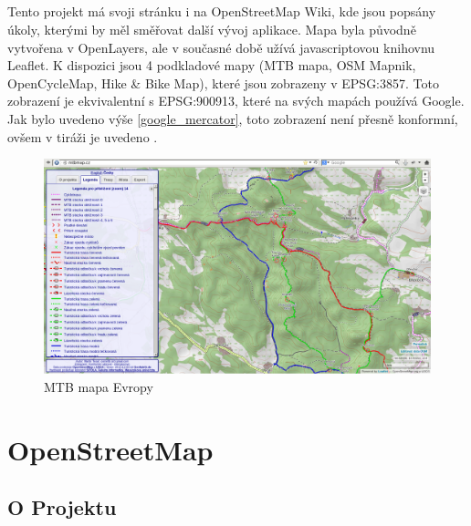 \documentclass[11pt,a4paper,titlepage,oneside]{book}
\begin{document}

		\paragraph{} Tento projekt má svoji stránku i na OpenStreetMap Wiki, kde jsou popsány úkoly, kterými by měl směřovat další vývoj aplikace. Mapa byla původně vytvořena v OpenLayers\cite{tesar_bp}, ale v současné době užívá javascriptovou knihovnu Leaflet. K dispozici jsou 4 podkladové mapy (MTB mapa, OSM Mapnik, OpenCycleMap, Hike \& Bike Map), které jsou zobrazeny v EPSG:3857. Toto zobrazení je ekvivalentní s EPSG:900913, které na svých mapách používá Google. Jak bylo uvedeno výše \ref{google_mercator}, toto zobrazení není přesně konformní, ovšem v tiráži je uvedeno .
		\begin{figure}[!h]
			\begin{center}
				\includegraphics[width=12cm]{obrazky/mtb.png}
				\caption{MTB mapa Evropy}
			\end{center}
		\end{figure}

\chapter{OpenStreetMap}
	\section{O Projektu}

\end{document}
